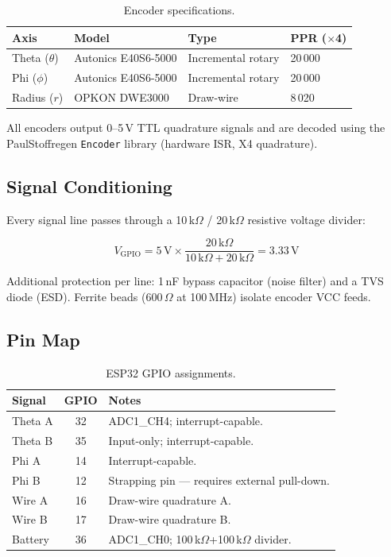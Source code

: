 \documentclass[11pt,a4paper]{article}
\begin{document}
\renewcommand{\arraystretch}{1.3}
\begin{table}[h]
\centering
\caption{Encoder specifications.}
\label{tab:encoders}
\begin{tabular}{@{}llll@{}}
\toprule
\textbf{Axis} & \textbf{Model} & \textbf{Type} &
  \textbf{PPR (\(\times\)4)} \\
\midrule
Theta (\(\theta\)) & Autonics E40S6-5000 & Incremental rotary & 20\,000 \\
Phi (\(\phi\))     & Autonics E40S6-5000 & Incremental rotary & 20\,000 \\
Radius (\(r\))     & OPKON DWE3000       & Draw-wire          & \phantom{0}8\,020 \\
\bottomrule
\end{tabular}
\end{table}

All encoders output 0--5\,V TTL quadrature signals and are decoded
using the PaulStoffregen \texttt{Encoder} library (hardware ISR, X4
quadrature).

\subsection{Signal Conditioning}

Every signal line passes through a 10\,k\(\Omega\) / 20\,k\(\Omega\)
resistive voltage divider:

\[
  V_\text{GPIO}
    = 5\,\text{V} \times \frac{20\,\text{k}\Omega}
                              {10\,\text{k}\Omega + 20\,\text{k}\Omega}
    = 3.33\,\text{V}
\]

Additional protection per line: 1\,nF bypass capacitor (noise filter)
and a TVS diode (ESD).  Ferrite beads (600\,\(\Omega\) at 100\,MHz)
isolate encoder VCC feeds.

\subsection{Pin Map}

\renewcommand{\arraystretch}{1.3}
\begin{table}[h]
\centering
\caption{ESP32 GPIO assignments.}
\label{tab:pins}
\begin{tabularx}{\textwidth}{@{}lcX@{}}
\toprule
\textbf{Signal} & \textbf{GPIO} & \textbf{Notes} \\
\midrule
Theta A  & 32 & ADC1\_CH4; interrupt-capable. \\
Theta B  & 35 & Input-only; interrupt-capable. \\
Phi A    & 14 & Interrupt-capable. \\
Phi B    & 12 & Strapping pin --- requires external pull-down. \\
Wire A   & 16 & Draw-wire quadrature A. \\
Wire B   & 17 & Draw-wire quadrature B. \\
Battery  & 36 & ADC1\_CH0; 100\,k\(\Omega\)+100\,k\(\Omega\) divider. \\
\bottomrule
\end{tabularx}
\end{table}
\end{document}
